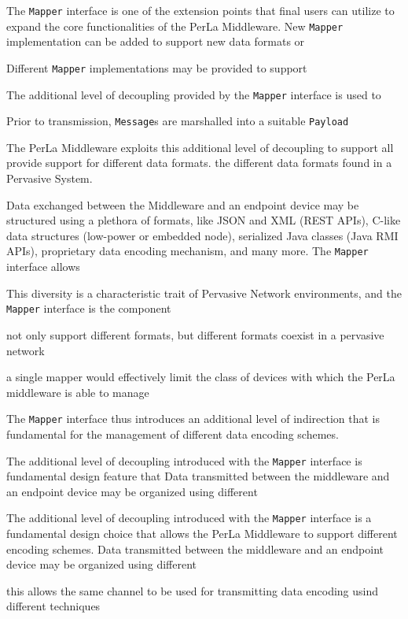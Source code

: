 The \texttt{Mapper} interface is one of the extension points that final users
can utilize to expand the core functionalities of the PerLa Middleware. New
\texttt{Mapper} implementation can be added to support new data formats or 

Different \texttt{Mapper} implementations may be provided to support 

The additional level of decoupling provided by the \texttt{Mapper} interface is
used to 

Prior to transmission, \texttt{Message}s are marshalled into a suitable
\texttt{Payload}

The PerLa Middleware exploits this additional level of decoupling to support
all provide support for different data formats. the different data formats found in a Pervasive System.



Data exchanged between the
Middleware and an endpoint device may be structured using a plethora of
formats, like JSON and XML (REST APIs), C-like data structures (low-power or
embedded node), serialized Java classes (Java RMI APIs), proprietary data
encoding mechanism, and many more. The \texttt{Mapper} interface allows 

This
diversity is a characteristic trait of Pervasive Network environments, and the
\texttt{Mapper} interface is the component 

not only support different formats, but different formats coexist in a
pervasive network

a single mapper would effectively limit the class of devices with which the PerLa
middleware is able to manage




The \texttt{Mapper}
interface thus introduces an additional level of indirection that is
fundamental for the management of different data encoding schemes.

The additional level of decoupling introduced with the \texttt{Mapper}
interface is fundamental design feature that Data transmitted between the middleware and
an endpoint device may be organized using different 

The additional level of decoupling introduced with the \texttt{Mapper}
interface is a fundamental design choice that allows the PerLa Middleware to
support different encoding schemes. Data transmitted between the middleware and
an endpoint device may be organized using different 

this allows the same channel to be used for transmitting data encoding usind
different techniques


